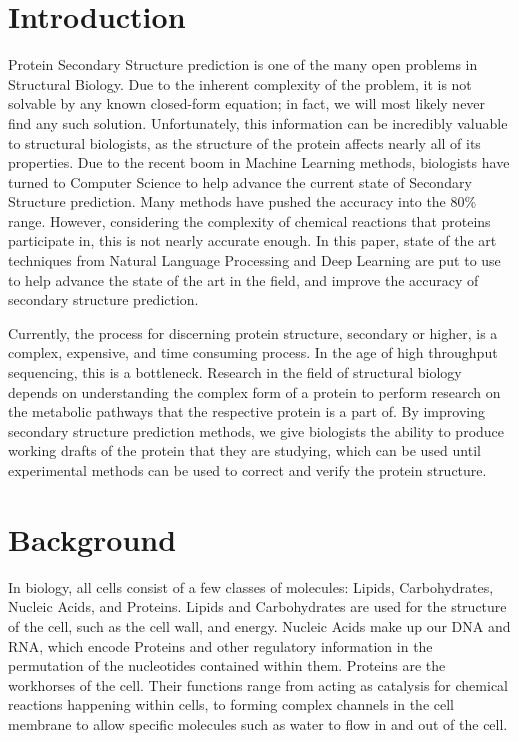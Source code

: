 \documentclass[pageno]{jpaper}
\begin{document}
\section{Introduction}
Protein Secondary Structure prediction is one of the many open problems in Structural Biology.  Due to the inherent complexity of the problem, it is not solvable by any known closed-form equation; in fact, we will most likely never find any such solution.  Unfortunately, this information can be incredibly valuable to structural biologists, as the structure of the protein affects nearly all of its properties.  Due to the recent boom in Machine Learning methods, biologists have turned to Computer Science to help advance the current state of Secondary Structure prediction.  Many methods have pushed the accuracy into the 80\% range.  However, considering the complexity of chemical reactions that proteins participate in, this is not nearly accurate enough.  In this paper, state of the art techniques from Natural Language Processing and Deep Learning are put to use to help advance the state of the art in the field, and improve the accuracy of secondary structure prediction.

\par
Currently, the process for discerning protein structure, secondary or higher, is a complex, expensive, and time consuming process.  In the age of high throughput sequencing, this is a bottleneck.  Research in the field of structural biology depends on understanding the complex form of a protein to perform research on the metabolic pathways that the respective protein is a part of.  By improving secondary structure prediction methods, we give biologists the ability to produce working drafts of the protein that they are studying, which can be used until experimental methods can be used to correct and verify the protein structure.

\section{Background}
In biology, all cells consist of a few classes of molecules: Lipids, Carbohydrates, Nucleic Acids, and Proteins.  Lipids and Carbohydrates are used for the structure of the cell, such as the cell wall, and energy.  Nucleic Acids make up our DNA and RNA, which encode Proteins and other regulatory information in the permutation of the nucleotides contained within them.  Proteins are the workhorses of the cell.  Their functions range from acting as catalysis for chemical reactions happening within cells, to forming complex channels in the cell membrane to allow specific molecules such as water to flow in and out of the cell.
\end{document}
